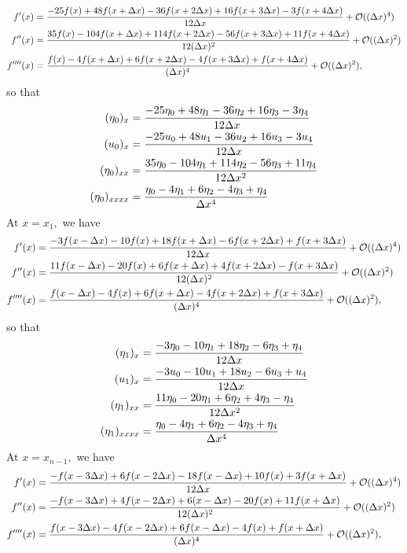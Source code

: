 \documentclass[10pt,reqno,oneside,a4paper, landscape]{article}
\begin{document}
\begin{align*}
f'(x)&= \frac{-25f(x) +48 f(x+\Delta x) -36f(x+ 2\Delta x) +16f(x+3\Delta x) - 3f(x+4\Delta x) }{12\Delta x} + \mathcal{O}((\Delta x)^4) \\
f''(x)&= \frac{35f(x)- 104 f(x+\Delta x) + 114 f(x+ 2\Delta x) - 56f(x+3\Delta x) + 11f(x+4\Delta x) }{12(\Delta x)^2} + \mathcal{O}((\Delta x)^2) \\
f''''(x)&= \frac{f(x) -4 f(x+\Delta x) + 6f (x+2\Delta x)- 4f(x+ 3\Delta x) + f(x+4\Delta x)}{(\Delta x)^4} + \mathcal{O}((\Delta x)^2),
\end{align*}
so that 
\begin{align*}
(\eta_0)_x &= \frac{-25\eta_0 +48 \eta_{1} -36\eta_2+16\eta_3 - 3\eta_4}{12\Delta x} \\
(u_0)_x &= \frac{-25u_0 +48 u_{1} -36u_2+16u_3 - 3u_4}{12\Delta x} \\
(\eta_0)_{xx} &= \frac{35\eta_0 -104 \eta_{1} +114 \eta_2 -56\eta_3 + 11\eta_4}{12\Delta x^2} \\
(\eta_0)_{xxxx} &= \frac{\eta_0 -4 \eta_{1} +6 \eta_2 -4\eta_3 + \eta_4}{\Delta x^4}
\end{align*}
At $x= x_1,$ we have 
\begin{align*}
f'(x)&= \frac{-3f(x-\Delta x) -10 f(x) +18f(x+ \Delta x) -6f(x+2\Delta x) + f(x+3\Delta x) }{12\Delta x} + \mathcal{O}((\Delta x)^4) \\
f''(x)&= \frac{11f(x-\Delta x) -20 f(x) +6f(x+ \Delta x) +4f(x+2\Delta x) - f(x+3\Delta x)}{12(\Delta x)^2} + \mathcal{O}((\Delta x)^2) \\
f''''(x)&= \frac{f(x-\Delta x) -4 f(x) +6f(x+ \Delta x) -4f(x+2\Delta x) + f(x+3\Delta x)}{(\Delta x)^4} + \mathcal{O}((\Delta x)^2),
\end{align*}
so that 
\begin{align*}
(\eta_1)_x &= \frac{-3\eta_0 -10 \eta_{1} + 18 \eta_2 -6 \eta_3 + \eta_4}{12\Delta x} \\
(u_1)_x &= \frac{-3u_0 - 10 u_{1} + 18 u_2 - 6 u_3 + u_4}{12\Delta x} \\
(\eta_1)_{xx} &= \frac{11\eta_0 -20 \eta_{1} +6 \eta_2 + 4\eta_3 - \eta_4}{12\Delta x^2} \\
(\eta_1)_{xxxx} &= \frac{\eta_0 -4 \eta_{1} +6 \eta_2 -4\eta_3 + \eta_4}{\Delta x^4}
\end{align*}
At $x= x_{n-1},$ we have
\begin{align*}
f'(x)&= \frac{-f(x-3\Delta x) +6 f(x- 2\Delta x) -18f(x- \Delta x) +10f(x) + 3f(x+\Delta x) }{12\Delta x} + \mathcal{O}((\Delta x)^4) \\
f''(x)&= \frac{-f(x-3\Delta x) +4 f(x- 2\Delta x) +6(x- \Delta x) -20 f(x) + 11 f(x+\Delta x) }{12(\Delta x)^2} + \mathcal{O}((\Delta x)^2) \\
f''''(x)&= \frac{f(x-3\Delta x) -4 f(x- 2\Delta x) +6f(x- \Delta x) -4f(x) + f(x+\Delta x) }{(\Delta x)^4} + \mathcal{O}((\Delta x)^2),
\end{align*}
\end{document}
